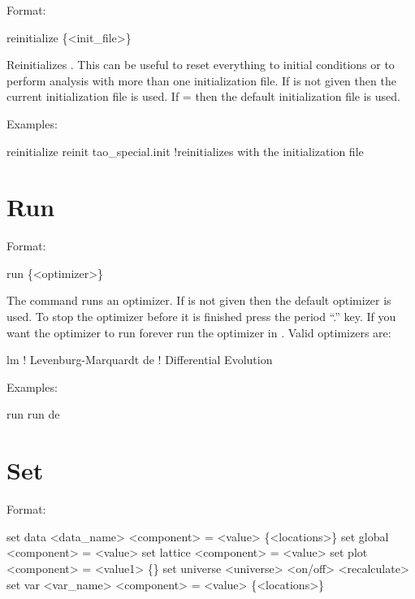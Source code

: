 Format:
\begin{example}
  reinitialize \{<init_file>\}
\end{example}

\vskip 0.2in Reinitializes \tao. This can be useful to reset everything to
initial conditions or to perform analysis with more than one initialization file.
If  is not given then 
the current initialization file is used. If  =  then
the default initialization file  is used.

Examples:
\begin{example}
  reinitialize 
  reinit tao_special.init !reinitializes \tao with the initialization file 
\end{example}


\section{Run}
\label{s:run}

Format:
\begin{example}
  run \{<optimizer>\}
\end{example}

\vskip 0.2in The  command runs an optimizer. If
 is not given then the default optimizer is used. To
stop the optimizer before it is finished press the period ``.''
key. If you want the optimizer to run forever run the optimizer in
. Valid optimizers are:
\begin{example}
  lm            ! Levenburg-Marquardt
  de            ! Differential Evolution
\end{example}

Examples:
\begin{example}
  run 
  run de
\end{example}

\section{Set}
\label{s:set}

Format:
\begin{example}
  set data <data_name> <component> = <value> \{<locations>\}
  set global <component> = <value>
  set lattice <component> = <value>
  set plot <component> = <value1> \{<value2>\}
  set universe <universe> <on/off> <recalculate>
  set var <var_name> <component> = <value> \{<locations>\}
\end{example}

